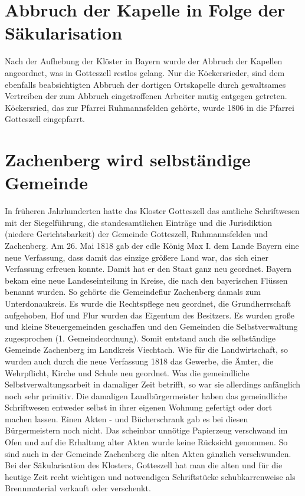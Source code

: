 \documentclass{book}
\begin{document}
\section{Abbruch der Kapelle in Folge der Säkularisation}

Nach der Aufhebung der Klöster in Bayern wurde der Abbruch der Kapellen
angeordnet, was in Gotteszell restlos gelang. Nur die Köckersrieder, sind dem
ebenfalls beabsichtigten Abbruch der dortigen Ortskapelle durch gewaltsames
Vertreiben der zum Abbruch eingetroffenen Arbeiter mutig entgegen getreten.
Köckersried, das zur Pfarrei Ruhmannsfelden gehörte, wurde 1806 in die Pfarrei
Gotteszell eingepfarrt.

\section{Zachenberg wird selbständige Gemeinde}

In früheren Jahrhunderten hatte das Kloster Gotteszell das amtliche Schriftwesen
mit der Siegelführung, die standesamtlichen Einträge und die Jurisdiktion
(niedere Gerichtsbarkeit) der Gemeinde Gotteszell, Ruhmannsfelden und
Zachenberg. Am 26. Mai 1818 gab der edle König Max I. dem Lande Bayern eine neue
Verfassung, dass damit das einzige größere Land war, das sich einer Verfassung
erfreuen konnte. Damit hat er den Staat ganz neu geordnet. Bayern bekam eine
neue Landeseinteilung in Kreise, die nach den bayerischen Flüssen benannt
wurden. So gehörte die Gemeindeflur Zachenberg damals zum Unterdonaukreis. Es
wurde die Rechtspflege neu geordnet, die Grundherrschaft aufgehoben, Hof und
Flur wurden das Eigentum des Besitzers. Es wurden große und kleine
Steuergemeinden geschaffen und den Gemeinden die Selbstverwaltung zugesprochen
(1. Gemeindeordnung). Somit entstand auch die selbständige Gemeinde Zachenberg
im Landkreis Viechtach. Wie für die Landwirtschaft, so wurden auch durch die
neue Verfassung 1818 das Gewerbe, die Ämter, die Wehrpflicht, Kirche und Schule
neu geordnet. Was die gemeindliche Selbstverwaltungsarbeit in damaliger Zeit
betrifft, so war sie allerdings anfänglich noch sehr primitiv. Die damaligen
Landbürgermeister haben das gemeindliche Schriftwesen entweder selbst in ihrer
eigenen Wohnung gefertigt oder dort machen lassen. Einen Akten - und
Bücherschrank gab es bei diesen Bürgermeistern noch nicht. Das scheinbar
unnötige Papierzeug verschwand im Ofen und auf die Erhaltung alter Akten wurde
keine Rücksicht genommen. So sind auch in der Gemeinde Zachenberg die alten
Akten gänzlich verschwunden. Bei der Säkularisation des Klosters, Gotteszell hat
man die alten und für die heutige Zeit recht wichtigen und notwendigen
Schriftstücke schubkarrenweise als Brennmaterial verkauft oder verschenkt.
\end{document}
